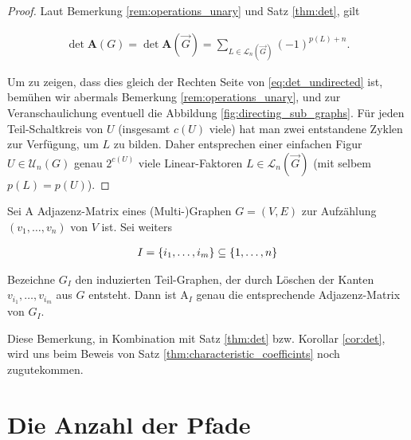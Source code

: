         \begin{proof}

            Laut Bemerkung \ref{rem:operations_unary} und Satz \ref{thm:det}, gilt

            \begin{align*}
                \det \mathbf A(G)
                =
                \det \mathbf A(\vec G)
                =
                \sum_{L \in \mathcal L_n(\vec G)}
                    (-1)^{p(L) + n}.
            \end{align*}

            Um zu zeigen, dass dies gleich der Rechten Seite von \eqref{eq:det_undirected} ist, bemühen wir abermals Bemerkung \ref{rem:operations_unary}, und zur Veranschaulichung eventuell die Abbildung \ref{fig:directing_sub_graphs}.
            Für jeden Teil-Schaltkreis von $U$ (insgesamt $c(U)$ viele) hat man zwei entstandene Zyklen zur Verfügung, um $L$ zu bilden.
            Daher entsprechen einer einfachen Figur $U \in \mathcal U_n(G)$ genau $2^{c(U)}$ viele Linear-Faktoren $L \in \mathcal L_n(\vec G)$ (mit selbem $p(L) = p(U)$).

        \end{proof}

        \begin{remark} \label{rem:induced_sub_graphs}

            Sei $\mathrm A$ Adjazenz-Matrix eines (Multi-)Graphen $G = (V, E)$ zur Aufzählung $(v_1, \dots, v_n)$ von $V$ ist.
            Sei weiters

            \begin{align*}
                I = {\left \{ i_1, \dots, i_m \right \}} \subseteq {\left \{ 1, \dots, n \right \}}
            \end{align*}

            Bezeichne $G_I$ den induzierten Teil-Graphen, der durch Löschen der Kanten $v_{i_1}, \dots, v_{i_m}$ aus $G$ entsteht.
            Dann ist $\mathrm A_I$ genau die entsprechende Adjazenz-Matrix von $G_I$.

            Diese Bemerkung, in Kombination mit Satz \ref{thm:det} bzw. Korollar \ref{cor:det}, wird uns beim Beweis von Satz \ref{thm:characteristic_coefficints} noch zugutekommen.

        \end{remark}

    \section{Die Anzahl der Pfade}

